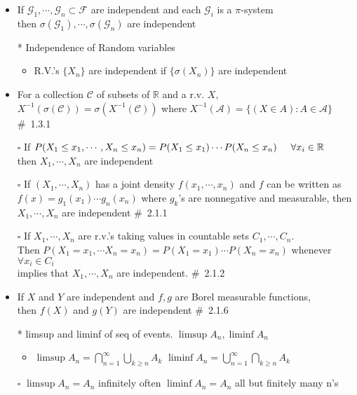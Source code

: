 \documentclass[12pt, A4]{article}
\begin{document}
\begin{itemize}
\begin{itemize}
	\end{itemize}
	\item If $\mathcal{G}_1,\cdots, \mathcal{G}_n\subset \mathcal{F}$ are independent and each $\mathcal{G}_i$ is a $\pi$-system \\ then $\sigma(\mathcal{G}_1),\cdots, \sigma(\mathcal{G}_n)$ are independent	
	\item[*] Independence of Random variables
	\begin{itemize}
		\item R.V.'s $\{X_n\}$ are independent if $\{\sigma(X_n)\}$ are independent 
	\end{itemize}
	\item For a collection $\mathcal{C}$ of subsets of $\mathbb{R}$ and a r.v. $X$, \newline $X^{-1}(\sigma(\mathcal{C}))=\sigma(X^{-1}(\mathcal{C}))$ where $X^{-1}(\mathcal{A})=\{(X\in A):A \in \mathcal{A} \}$ \#\ 1.3.1
	\item[$\square$] If $P(X_1\leq x_1, \cdots , X_n\leq x_n)=P(X_1\leq x_1)\cdots P(X_n\leq x_n)\hspace{0.5cm} \forall x_i\in \mathbb{R}$\\then $X_1, \cdots, X_n$ are independent
	\item[$\square$]If $(X_1,\cdots, X_n)$ has a joint density $f(x_1, \cdots, x_n)$ and $f$ can be written as $f(x)=g_1(x_1)\cdots g_n(x_n)$ where $g_k$'s are nonnegative and measurable, then $X_1,\cdots, X_n$ are independent  \quad \#\ 2.1.1
	\item[$\square$]If $X_1,\cdots,X_n$ are r.v.'s taking values in countable sets $C_1,\cdots, C_n$. \\ Then $P(X_1=x_1,\cdots X_n=x_n)=P(X_1=x_1)\cdots P(X_n=x_n)$ whenever $\forall x_i\in C_i$ \\ implies that $X_1, \cdots , X_n$ are independent. \quad \#\ 2.1.2
	\item If $X$ and $Y$ are independent and $f,g$ are Borel measurable functions, \\ then $f(X)$ and $g(Y)$ are independent \quad \#\ 2.1.6
	\item[*] limsup and liminf of seq of events. $\limsup A_n, \liminf A_n$
	\begin{itemize}
		\item $\limsup A_n=\bigcap_{n=1}^{\infty}\bigcup_{k\geq n}A_k$\quad
		$\liminf A_n=\bigcup_{n=1}^{\infty}\bigcap_{k\geq n}A_k$
	\end{itemize}
	\item[$\square$] $\limsup A_n=A_n$ infinitely often \quad $\liminf A_n=A_n$ all but finitely many n's

\end{itemize}
\end{document}

